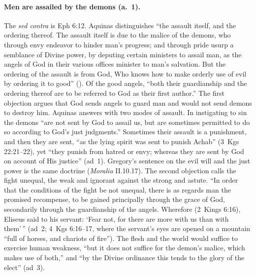 \paragraph{Men are assailed by the demons (a.~1).} The \emph{sed contra} is
Eph 6:12. Aquinas distinguishes ``the assault itself, and the ordering
thereof. The assault itself is due to the malice of the demons, who through
envy endeavor to hinder man's progress; and through pride usurp a semblance
of Divine power, by deputing certain ministers to assail man, as the angels
of God in their various offices minister to man's salvation. But the
ordering of the assault is from God, Who knows how to make orderly use of
evil by ordering it to good'' (). Of the good angels,
``both their guardianship and the ordering thereof are to be referred to
God as their first author.'' The first objection argues that God sends
angels to guard man and would not send demons to destroy him. Aquinas
answers with two modes of assault. In instigating to sin the demons ``are
not sent by God to assail us, but are sometimes permitted to do so
according to God's just judgments.'' Sometimes their assault is a
punishment, and then they are sent, ``as the lying spirit was sent to punish
Achab'' (3~Kgs 22:21--22), yet ``they punish from hatred or envy; whereas
they are sent by God on account of His justice'' (ad~1). Gregory's
sentence on the evil will and the just power is the same doctrine
(\emph{Moralia} II.10.17). The second objection calls the fight unequal,
the weak and ignorant against the strong and astute. ``In order that the
conditions of the fight be not unequal, there is as regards man the
promised recompense, to be gained principally through the grace of God,
secondarily through the guardianship of the angels. Wherefore (2~Kings
6:16), Eliseus said to his servant: `Fear not, for there are more with us
than with them'\,'' (ad~2; 4~Kgs 6:16--17, where the servant's eyes are
opened on a mountain ``full of horses, and chariots of fire''). The flesh
and the world would suffice to exercise human weakness, ``but it does not
suffice for the demon's malice, which makes use of both,'' and ``by the
Divine ordinance this tends to the glory of the elect'' (ad~3).

